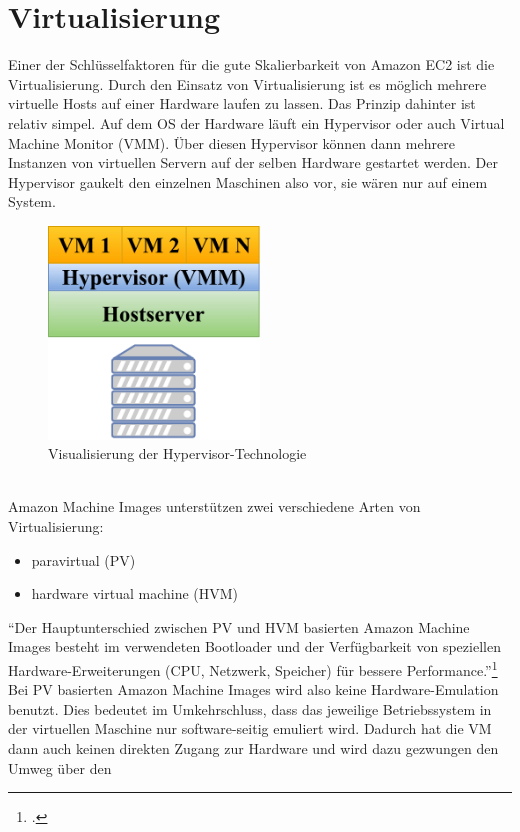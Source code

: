 \documentclass[titlepage]{report}
\begin{document}
\section*{Virtualisierung}
Einer der Schlüsselfaktoren für die gute Skalierbarkeit von Amazon EC2
ist die Virtualisierung. Durch den Einsatz von Virtualisierung ist es
möglich mehrere virtuelle Hosts auf einer Hardware laufen zu lassen.
Das Prinzip dahinter ist relativ simpel. Auf dem OS der Hardware läuft
ein Hypervisor oder auch Virtual Machine Monitor (VMM). Über diesen
Hypervisor können dann mehrere Instanzen von virtuellen Servern auf der
selben Hardware gestartet werden. Der Hypervisor gaukelt den einzelnen
Maschinen also vor, sie wären nur auf einem System.
\begin{figure}[h]
    \centering
    \includegraphics[width=0.5\textwidth]{figures/hypervisor.pdf}
    \caption{Visualisierung der Hypervisor\hyp{}Technologie}\label{fig:4}
\end{figure}
\\
Amazon Machine Images unterstützen zwei verschiedene Arten von
Virtualisierung:
\begin{itemize}
    \item paravirtual (PV)
    \item hardware virtual machine (HVM)
\end{itemize}
``Der Hauptunterschied zwischen PV und HVM basierten Amazon Machine
Images besteht im verwendeten Bootloader und der Verfügbarkeit von
speziellen Hardware\hyp{}Erweiterungen (CPU, Netzwerk, Speicher) für bessere
Performance.''\footcite{virtualization} Bei PV basierten Amazon Machine
Images wird also keine Hardware\hyp{}Emulation benutzt. Dies bedeutet im
Umkehrschluss, dass das jeweilige Betriebssystem in der virtuellen Maschine nur
software\hyp{}seitig emuliert wird. Dadurch hat die VM dann auch keinen
direkten Zugang zur Hardware und wird dazu gezwungen den Umweg über den
\end{document}
